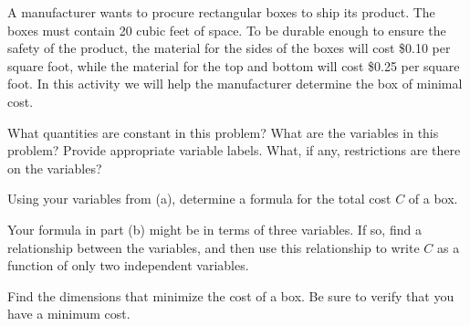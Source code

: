 \begin{activity} \label{A:10.7.7} A manufacturer wants to procure rectangular boxes to ship its product. The boxes must contain 20 cubic feet of space. To be durable enough to ensure the safety of the product, the material for the sides of the boxes will cost \$0.10 per square foot, while the material for the top and bottom will cost \$0.25 per square foot. In this activity we will help the manufacturer determine the box of minimal cost.
    \ba
    \item What quantities are constant in this problem? What are the variables in this problem? Provide appropriate variable labels. What, if any, restrictions are there on the variables?

    \item Using your variables from (a), determine a formula for the total cost $C$ of a box.


    \item Your formula in part (b) might be in terms of three variables. If so, find a relationship between the variables, and then use this relationship to write $C$ as a function of only two independent variables.


    \item Find the dimensions that minimize the cost of a box. Be sure to verify that you have a minimum cost.


	\ea

\end{activity}
\begin{smallhint}

\end{smallhint}
\begin{bighint}

\end{bighint}
